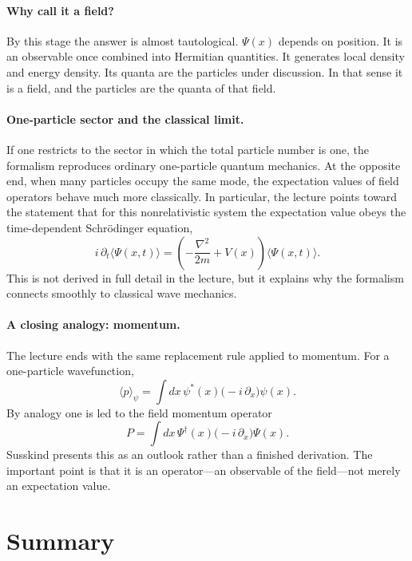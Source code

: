 \paragraph{Why call it a field?}
By this stage the answer is almost tautological. $\Psi(x)$ depends on position. It is an observable once combined into Hermitian quantities. It generates local density and energy density. Its quanta are the particles under discussion. In that sense it is a field, and the particles are the quanta of that field.

\paragraph{One-particle sector and the classical limit.}
If one restricts to the sector in which the total particle number is one, the formalism reproduces ordinary one-particle quantum mechanics. At the opposite end, when many particles occupy the same mode, the expectation values of field operators behave much more classically. In particular, the lecture points toward the statement that for this nonrelativistic system the expectation value obeys the time-dependent Schrödinger equation,
\begin{equation}
i\,\partial_t\langle \Psi(x,t)\rangle
=
\left(-\frac{\nabla^2}{2m}+V(x)\right)\langle \Psi(x,t)\rangle.
\end{equation}
This is not derived in full detail in the lecture, but it explains why the formalism connects smoothly to classical wave mechanics.

\paragraph{A closing analogy: momentum.}
The lecture ends with the same replacement rule applied to momentum. For a one-particle wavefunction,
\begin{equation}
\langle p\rangle_\psi=\int dx\,\psi^*(x)\bigl(-i\,\partial_x\bigr)\psi(x).
\end{equation}
By analogy one is led to the field momentum operator
\begin{equation}
P=\int dx\,\Psi^\dagger(x)\bigl(-i\,\partial_x\bigr)\Psi(x).
\end{equation}
Susskind presents this as an outlook rather than a finished derivation. The important point is that it is an operator---an observable of the field---not merely an expectation value.

\section{Summary}

